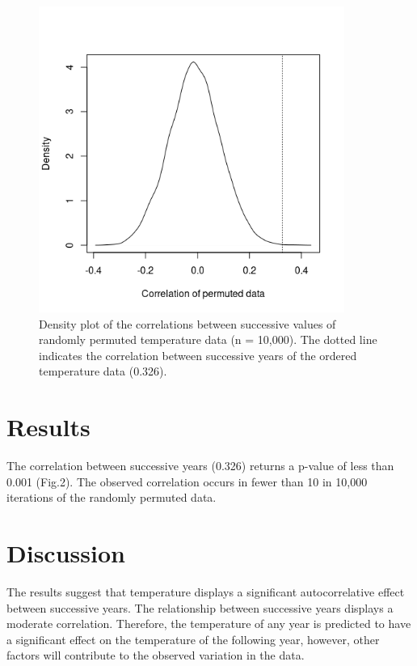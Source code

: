 \documentclass[12pt]{article}
\begin{document}
    \begin{figure}[h!]
        \includegraphics[width=10cm]{Fig2}
        \centering
        \caption{Density plot of the correlations between successive values of randomly permuted temperature data (n = 10,000).
         The dotted line indicates the correlation between successive years of the ordered temperature data (0.326).}
    \end{figure}

    \section{Results}
        The correlation between successive years (0.326) returns a p-value of less than 0.001 (Fig.2). The 
        observed correlation occurs in fewer than 10 in 10,000 iterations of the randomly permuted data. 

    \section{Discussion}
        The results suggest that temperature displays a significant autocorrelative effect between successive years. The 
        relationship between successive years displays a moderate correlation. Therefore, the temperature of any year is 
        predicted to have a significant effect on the temperature of the following year, however, other factors will 
        contribute to the observed variation in the data.
\end{document}
